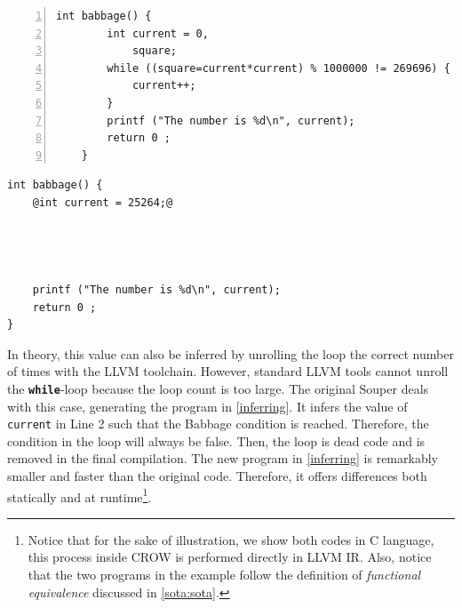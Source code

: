 {


\begin{minipage}[t]{0.45\linewidth}
    \begin{lstlisting}[numbers=left]
    int babbage() {
        int current = 0,
            square;
        while ((square=current*current) % 1000000 != 269696) {
            current++;
        }
        printf ("The number is %d\n", current);
        return 0 ;
    }
    \end{lstlisting}
\end{minipage}
\begin{minipage}[t]{0.45\linewidth}
    \begin{lstlisting}[]
int babbage() {
    @int current = 25264;@
    
    


    printf ("The number is %d\n", current);
    return 0 ;
}
    \end{lstlisting}
\end{minipage}
}
In theory, this value can also be inferred by unrolling the loop the correct number of times with the LLVM toolchain.
However, standard LLVM tools cannot unroll the \texttt{\textbf{while}}-loop because the loop count is too large.
The original Souper deals with this case, generating the program in \autoref{inferring}. It infers the value of \texttt{current} in Line 2 such that the Babbage condition is reached. Therefore, the condition in the loop will always be false. Then, the loop is dead code and is removed in the final compilation. 
The new program in \autoref{inferring} is remarkably smaller and faster than the original code. Therefore, it offers differences both statically and at runtime\footnote{ Notice that for the sake of illustration, we show both codes in C language, this process inside CROW is performed directly in LLVM IR. Also, notice that the two programs in the example follow the definition of \emph{functional equivalence} discussed in \autoref{sota:sota}.}.




